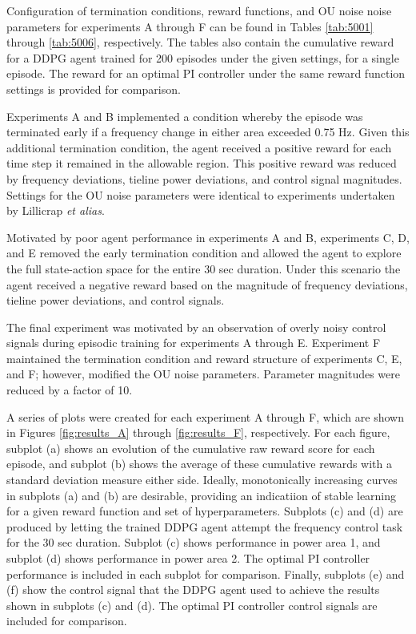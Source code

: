 \newpage

Configuration of termination conditions, reward functions, and OU noise noise parameters for experiments A through F can be found in Tables \ref{tab:5001} through \ref{tab:5006}, respectively. The tables also contain the cumulative reward for a DDPG agent trained for 200 episodes under the given settings, for a single episode. The reward for an optimal PI controller under the same reward function settings is provided for comparison. 

Experiments A and B implemented a condition whereby the episode was terminated early if a frequency change in either area exceeded 0.75 Hz. Given this additional termination condition, the agent received a positive reward for each time step it remained in the allowable region. This positive reward was reduced by frequency deviations, tieline power deviations, and control signal magnitudes. Settings for the OU noise parameters were identical to experiments undertaken by Lillicrap \textit{et alias}.

Motivated by poor agent performance in experiments A and B, experiments C, D, and E removed the early termination condition and allowed the agent to explore the full state-action space for the entire 30 sec duration. Under this scenario the agent received a negative reward based on the magnitude of frequency deviations, tieline power deviations, and control signals.

The final experiment was motivated by an observation of overly noisy control signals during episodic training for experiments A through E. Experiment F maintained the termination condition and reward structure of experiments C, E, and F; however, modified the OU noise parameters. Parameter magnitudes were reduced by a factor of 10.

A series of plots were created for each experiment A through F, which are shown in Figures \ref{fig:results_A} through \ref{fig:results_F}, respectively. For each figure, subplot (a) shows an evolution of the cumulative raw reward score for each episode, and subplot (b) shows the average of these cumulative rewards with a standard deviation measure either side. Ideally, monotonically increasing curves in subplots (a) and (b) are desirable, providing an indicatiion of stable learning for a given reward function and set of hyperparameters. Subplots (c) and (d) are produced by letting the trained DDPG agent attempt the frequency control task for the 30 sec duration. Subplot (c) shows performance in power area 1, and subplot (d) shows performance in power area 2. The optimal PI controller performance is included in each subplot for comparison. Finally, subplots (e) and (f) show the control signal that the DDPG agent used to achieve the results shown in subplots (c) and (d). The optimal PI controller control signals are included for comparison.



